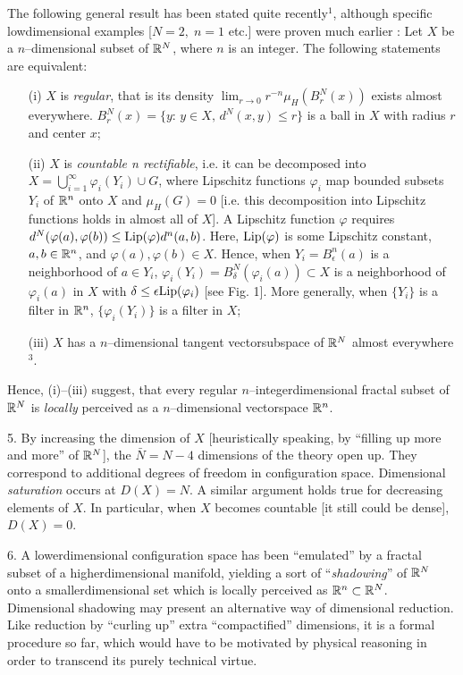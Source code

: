 \documentclass[pra,amssymb,twocolumn]{revtex4}
\begin{document}
The following general result has been stated quite recently$^1$,
although specific lowdimensional examples [$N=2, \; n=1$ etc.]
were proven much earlier \cite[see in particular 3. 2. 19 and 3. 3. 22]{federer1}:
Let $X$ be a $n$--dimensional subset of ${\Bbb R}^N$, where $n$ is an
integer.
The following statements are equivalent:
\begin{itemize}
\item[(i)]$X$ is {\it regular}, that is its density
$\lim_{r\rightarrow 0}r^{-n}\mu_H(B_r^N(x))$ exists
almost everywhere. $B_r^N(x)=\{y:\, y\in X,\, d^N(x,y)\le r\} $
is a ball in $X$ with radius $r$ and center $x$;
\item[(ii)]$X$ is {\it countable n rectifiable},
i.e. it can be decomposed into
$X=\bigcup_{i=1}^\infty \varphi_i(Y_i)\cup G$,
where Lipschitz functions $\varphi_i$
map bounded subsets $Y_i$ of ${\Bbb R}^n$ onto $X$ and $\mu_H(G)=0$
[i.e. this decomposition into Lipschitz functions holds in
almost all of $X$].
A Lipschitz function $\varphi $ requires
$d^N(\varphi (a),\varphi (b))\le {\rm Lip}(\varphi )
d^n(a,b)$. Here, ${\rm Lip}(\varphi )$ is some Lipschitz constant,
$a,b\in {\Bbb R}^n$, and $\varphi (a),\varphi (b)\in X$.
Hence, when $Y_i=B_\epsilon ^n(a)$ is a neighborhood of $a\in Y_i$,
$\varphi_i(Y_i)=B_\delta ^N(\varphi_i(a))\subset X$
is a neighborhood of $\varphi_i(a)$ in $X$ with
$\delta \le \epsilon {\rm Lip}(\varphi_i )$ [see Fig. 1].
More generally, when $\{ Y_i\} $ is a filter in ${\Bbb R}^n$,
$\{ \varphi_i(Y_i)\} $ is a filter in $X$;
\item[(iii)]$X$ has a $n$--dimensional tangent vectorsubspace
of ${\Bbb R}^N$ almost everywhere$^3$.
\end{itemize}


Hence, (i)--(iii) suggest, that every regular $n$--integerdimensional
fractal subset of ${\Bbb R}^N$
is {\it locally} perceived as a $n$--dimensional
vectorspace ${\Bbb R}^n$.


5.
By increasing the dimension of $X$ [heuristically speaking,
by ``filling up more and more'' of ${\Bbb R}^N$],
the $\bar N=N-4$ dimensions of the theory open up.
They correspond to additional degrees of freedom in configuration space.
Dimensional {\it saturation} occurs at $D(X)=N$.
A similar argument holds true for decreasing elements of $X$.
In particular, when $X$ becomes countable [it still could
be dense], $D(X)=0$.



6.
A lowerdimensional configuration space has been
``emulated'' by a fractal subset of a higherdimensional
manifold, yielding a sort of ``{\it shadowing}''
of ${\Bbb R}^N$ onto a smallerdimensional set
which is locally perceived as ${\Bbb R}^n\subset {\Bbb R}^N$.
Dimensional shadowing may present an alternative way of
dimensional reduction.
Like reduction by ``curling up'' extra ``compactified'' dimensions,
it is a formal procedure so far, which would have to be motivated
by physical reasoning in order to
transcend its purely technical virtue.
\end{document}
